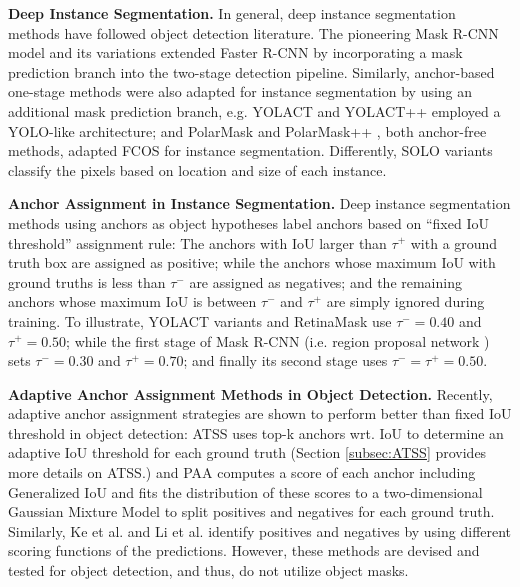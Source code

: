 \documentclass{bmvc2k}
\begin{document}
\noindent \textbf{Deep Instance Segmentation.} In general, deep instance segmentation methods have followed object detection literature. The pioneering Mask R-CNN model \cite{MaskRCNN} and its variations \cite{maskscoring,RSLoss} extended Faster R-CNN \cite{FasterRCNN} by incorporating a mask prediction branch into the two-stage detection pipeline. Similarly,  anchor-based one-stage methods were also adapted for instance segmentation by using an additional mask prediction branch, e.g. YOLACT \cite{yolact} and YOLACT++ \cite{yolact-plus} employed a YOLO-like architecture; and PolarMask \cite{polarmask} and PolarMask++ \cite{PolarMask-plus}, both anchor-free methods, adapted FCOS \cite{FCOS} for instance segmentation. Differently, SOLO variants \cite{solo,solov2} classify the pixels based on  location and size of each instance.

\noindent \textbf{Anchor Assignment in Instance Segmentation.} Deep instance segmentation methods using anchors as object hypotheses label anchors based on ``fixed IoU threshold'' assignment rule: The anchors with IoU larger than $\tau^+$ with a ground truth box are assigned as positive; while the anchors whose maximum IoU with ground truths is less than $\tau^-$ are assigned as negatives; and the remaining anchors whose maximum IoU is between $\tau^-$ and $\tau^+$ are simply ignored during training. To illustrate, YOLACT variants \cite{yolact,yolact-plus} and RetinaMask \cite{retinamask} use  $\tau^-=0.40$ and $\tau^+=0.50$; while the first stage of Mask R-CNN (i.e. region proposal network \cite{FasterRCNN}) sets $\tau^-=0.30$ and $\tau^+=0.70$; and finally its second stage \cite{MaskRCNN} uses $\tau^-=\tau^+=0.50$. 



\noindent \textbf{Adaptive Anchor Assignment Methods in Object Detection.} Recently, adaptive anchor assignment strategies are shown to perform better than fixed IoU threshold in object detection: ATSS \cite{ATSS} uses top-k anchors wrt. IoU to determine an adaptive IoU threshold for each ground truth (Section \ref{subsec:ATSS} provides more details on ATSS.) and PAA \cite{paa} computes a score of each anchor including Generalized IoU and fits the distribution of these scores to a two-dimensional Gaussian Mixture Model to split positives and negatives for each ground truth. Similarly, Ke et al. \cite{mal} and Li et al. \cite{noisyanchor} identify  positives and negatives by using different scoring functions of the predictions. However, these methods are devised and tested for object detection, and thus, do not utilize object masks. 
\end{document}

